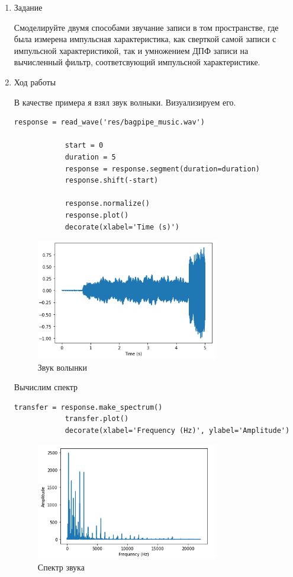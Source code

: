 \documentclass[a4paper,12pt]{article}
\begin{document}
	\begin{enumerate}
		
		\item{Задание}
		
		Смоделируйте двумя способами звучание записи в том пространстве, где была измерена импульсная характеристика, как сверткой самой записи с импульсной характеристикой, так и умножением ДПФ записи на вычисленный фильтр, соответсвующий импульсной характеристике.
		
		\item{Ход работы}
		
		В качестве примера я взял звук волныки. Визуализируем его.
		\begin{lstlisting}[caption=Звук волынки]
			response = read_wave('res/bagpipe_music.wav')
			
			start = 0
			duration = 5
			response = response.segment(duration=duration)
			response.shift(-start)
			
			response.normalize()
			response.plot()
			decorate(xlabel='Time (s)')
		\end{lstlisting}
		\begin{figure}[H]
			\centering
			\includegraphics[width=0.75\textwidth]{2_1.png}
			\caption{Звук волынки}
			\label{fig:2.1}
		\end{figure}
		 
		
		Вычислим спектр
		\begin{lstlisting}[caption=Вычисляем спектр]
			transfer = response.make_spectrum()
			transfer.plot()
			decorate(xlabel='Frequency (Hz)', ylabel='Amplitude')
		\end{lstlisting}
		\begin{figure}[H]
			\centering
			\includegraphics[width=0.75\textwidth]{2_2.png}
			\caption{Спектр звука}
			\label{fig:2.2}
		\end{figure}
		

\end{enumerate}
\end{document}

